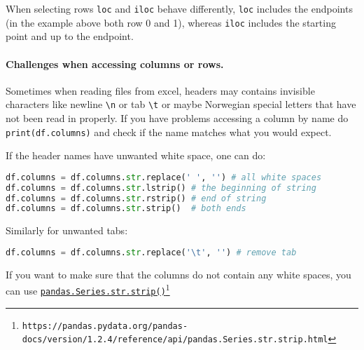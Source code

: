 \documentclass[graybox,sectrefs,envcountresetchap,open=right,final]{svmonodo}
\newenvironment{graybox2admon}[1][]{
\begin{graybox2mdframed}[frametitle=#1]
}
{
\end{graybox2mdframed}
}
\begin{document}
\begin{graybox2admon}[\texttt{pandas.DataFrame.loc} vs \texttt{pandas.DataFrame.iloc}]
When selecting rows \texttt{loc} and \texttt{iloc} behave differently, \texttt{loc} includes the endpoints (in the example above both row 0 and 1), whereas \texttt{iloc} includes the starting point and up to the endpoint.
\end{graybox2admon}




\paragraph{Challenges when accessing columns or rows.}


\begin{graybox2admon}[Special characters]
Sometimes when reading files from excel, headers may contains invisible characters like newline \Verb!\n! or tab \Verb!\t! or maybe Norwegian special letters that have not been read in properly. If you have problems accessing a column by name do \texttt{print(df.columns)} and check if the name matches what you would expect.
\end{graybox2admon}




If the header names have unwanted white space, one can do:





\begin{lstlisting}[language=python,style=blue1bar]
df.columns = df.columns.str.replace(' ', '') # all white spaces
df.columns = df.columns.str.lstrip() # the beginning of string
df.columns = df.columns.str.rstrip() # end of string
df.columns = df.columns.str.strip()  # both ends

\end{lstlisting}

Similarly for unwanted tabs:


\begin{lstlisting}[language=python,style=blue1bar]
df.columns = df.columns.str.replace('\t', '') # remove tab

\end{lstlisting}

If you want to make sure that the columns do not contain any white spaces, you can use \href{{https://pandas.pydata.org/pandas-docs/version/1.2.4/reference/api/pandas.Series.str.strip.html}}{\nolinkurl{pandas.Series.str.strip()}\footnote{\texttt{https://pandas.pydata.org/pandas-docs/version/1.2.4/reference/api/pandas.Series.str.strip.html}}}
\end{document}
